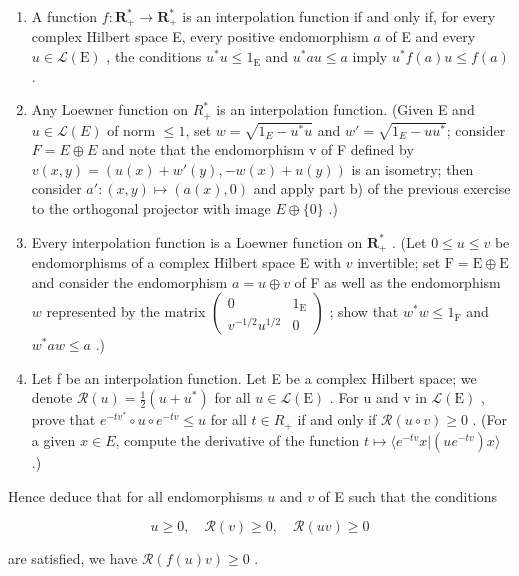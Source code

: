 \begin{enumerate}
\def\labelenumi{\alph{enumi})}
\item
  A function \(f \colon \mathbf{R}_+^* \to \mathbf{R}_+^*\) is an interpolation function if and only if, for every complex Hilbert space E, every positive endomorphism \(a\) of E and every \(u \in \mathcal{L}(\mathrm{E})\) , the conditions \(u^*u \leqslant 1_{\mathrm{E}}\) and \(u^*au \leqslant a\) imply \(u^*f(a)u \leqslant f(a)\) .
\item
  Any Loewner function on \(R_{+}^{*}\) is an interpolation function. (Given E and \(u \in \mathcal{L}(E)\) of norm \(\leqslant 1\), set \(w = \sqrt{1_{E} - u^{*}u}\) and \(w' = \sqrt{1_{E}-uu^{*}}\); consider \(F = E \oplus E\) and note that the endomorphism v of F defined by \(v(x,y) = (u(x)+w'(y), -w(x)+u(y))\) is an isometry; then consider \(a' \colon (x,y) \mapsto (a(x),0)\) and apply part b) of the previous exercise to the orthogonal projector with image \(E \oplus \{0\}\) .)
\item
  Every interpolation function is a Loewner function on \(\mathbf{R}_{+}^{*}\) . (Let \(0 \leqslant u \leqslant v\) be endomorphisms of a complex Hilbert space E with \(v\) invertible; set \(\mathrm{F} = \mathrm{E} \oplus \mathrm{E}\) and consider the endomorphism \(a = u \oplus v\) of F as well as the endomorphism \(w\) represented by the matrix \(\left( \begin{array}{cc}0 & 1_{\mathrm{E}}\\ v^{-1/2}u^{1/2} & 0 \end{array} \right)\) ; show that \(w^{*}w \leqslant 1_{\mathrm{F}}\) and \(w^{*}aw \leqslant a\) .)
\item
  Let f be an interpolation function. Let E be a complex Hilbert space; we denote \(\mathcal{R}(u)=\frac{1}{2}(u+u^{*})\) for all \(u\in\mathcal{L}(\mathrm{E})\) . For u and v in \(\mathcal{L}(\mathrm{E})\) , prove that \(e^{-tv^{*}}\circ u\circ e^{-tv}\leqslant u\) for all \(t\in R_{+}\) if and only if \(\mathcal{R}(u\circ v)\geqslant0\) . (For a given \(x\in E\), compute the derivative of the function \(t\mapsto\langle e^{-tv}x|(ue^{-tv})x\rangle\) .)
\end{enumerate}

Hence deduce that for all endomorphisms \(u\) and \(v\) of E such that the conditions

\[
u \geqslant 0, \quad \mathcal {R} (v) \geqslant 0, \quad \mathcal {R} (u v) \geqslant 0
\]

are satisfied, we have \(\mathcal{R}(f(u)v) \geqslant 0\) .

